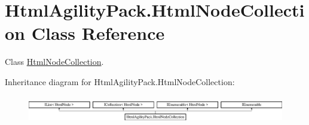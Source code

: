 \hypertarget{class_html_agility_pack_1_1_html_node_collection}{}\section{Html\+Agility\+Pack.\+Html\+Node\+Collection Class Reference}
\label{class_html_agility_pack_1_1_html_node_collection}


Class \hyperlink{class_html_agility_pack_1_1_html_node_collection}{Html\+Node\+Collection}.  


Inheritance diagram for Html\+Agility\+Pack.\+Html\+Node\+Collection\+:\begin{figure}[H]
\begin{center}
\leavevmode
\includegraphics[height=1.266968cm]{class_html_agility_pack_1_1_html_node_collection}
\end{center}
\end{figure}
